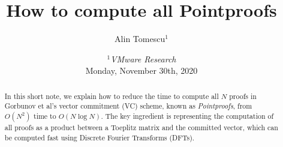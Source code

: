 \documentclass{llncs}
\title{\textbf{How to compute all Pointproofs}} %
\author{Alin Tomescu$^{1}$}
\date{%
{\small $^1$\textit{VMware Research}}\\[.5em]%
{\small Monday, November 30th, 2020}}
\author{}
\date{}                     %
\begin{document}
\maketitle

\ifEurocrypt
    \vspace{-5em}
\fi
\begin{abstract}
    In this short note, we explain how to reduce the time to compute all $N$ proofs in Gorbunov et al's vector commitment (VC) scheme, known as \textit{Pointproofs}, from $O(N^2)$ time to $O(N\log{N})$.
    The key ingredient is representing the computation of all proofs as a product between a Toeplitz matrix and the committed vector, which can be computed fast using Discrete Fourier Transforms (DFTs).
\end{abstract}







\ifEurocrypt
    
    {\footnotesize
    }
\else
    \clearpage
    
    
\fi


\ifNotEurocrypt
\fi
\end{document}
